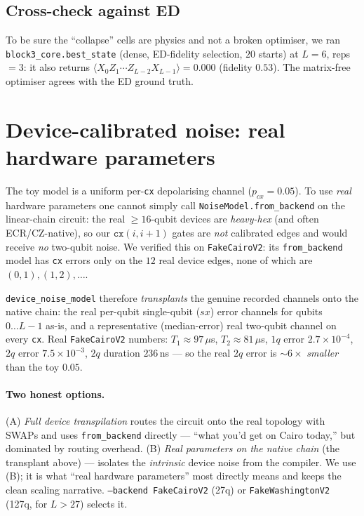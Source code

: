 \documentclass[11pt]{article}
\newcommand{\Oedge}{X_0 Z_1\cdots Z_{L-2} X_{L-1}}
\newcommand{\expv}[1]{\langle #1\rangle}
\newcommand{\cx}{\texttt{cx}}
\newcommand{\code}[1]{\texttt{#1}}
\begin{document}
\subsection{Cross-check against ED}
To be sure the ``collapse'' cells are physics and not a broken optimiser, we ran
\code{block3\_core.best\_state} (dense, ED-fidelity selection, $20$ starts) at
$L=6$, reps${}=3$: it also returns $\expv{\Oedge}=0.000$ (fidelity $0.53$). The
matrix-free optimiser agrees with the ED ground truth.

\section{Device-calibrated noise: real hardware parameters}
The toy model is a uniform per-\cx{} depolarising channel ($p_{cx}=0.05$). To use
\emph{real} hardware parameters one cannot simply call
\code{NoiseModel.from\_backend} on the linear-chain circuit: the real
$\ge16$-qubit devices are \emph{heavy-hex} (and often ECR/CZ-native), so our
$\cx(i,i{+}1)$ gates are \emph{not} calibrated edges and would receive \emph{no}
two-qubit noise. We verified this on \code{FakeCairoV2}: its \code{from\_backend}
model has \cx{} errors only on the $12$ real device edges, none of which are
$(0,1),(1,2),\ldots$.

\code{device\_noise\_model} therefore \emph{transplants} the genuine recorded
channels onto the native chain: the real per-qubit single-qubit ($sx$) error
channels for qubits $0\ldots L{-}1$ as-is, and a representative (median-error)
real two-qubit channel on every \cx{}. Real \code{FakeCairoV2} numbers:
$T_1\approx97\,\mu$s, $T_2\approx81\,\mu$s, $1q$ error $2.7\times10^{-4}$,
$2q$ error $7.5\times10^{-3}$, $2q$ duration $236$\,ns --- so the real $2q$ error
is ${\sim}6\times$ \emph{smaller} than the toy $0.05$.

\paragraph{Two honest options.} (A) \emph{Full device transpilation} routes the
circuit onto the real topology with SWAPs and uses \code{from\_backend} directly
--- ``what you'd get on Cairo today,'' but dominated by routing overhead. (B)
\emph{Real parameters on the native chain} (the transplant above) --- isolates
the \emph{intrinsic} device noise from the compiler. We use (B); it is what
``real hardware parameters'' most directly means and keeps the clean scaling
narrative. \code{--backend FakeCairoV2} (27q) or \code{FakeWashingtonV2} (127q,
for $L>27$) selects it.
\end{document}
